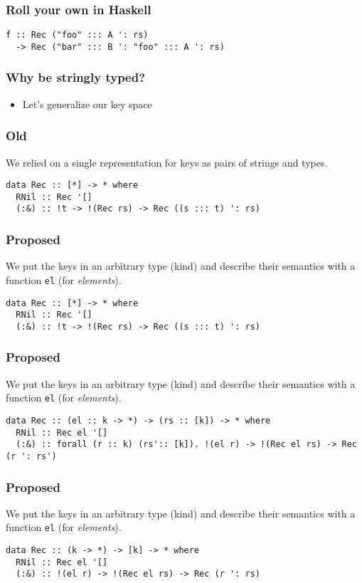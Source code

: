 \documentclass[tikz, 12pt]{beamer}
\begin{document}
\begin{frame}[fragile]
  \frametitle{Roll your own in Haskell}\pause
  \begin{lstlisting}
f :: Rec ("foo" ::: A ': rs)
  -> Rec ("bar" ::: B ': "foo" ::: A ': rs)
  \end{lstlisting}
\end{frame}

\begin{frame}
  \frametitle{Why be stringly typed?}\pause
  \begin{itemize}
    \item Let's generalize our key space
  \end{itemize}
\end{frame}

\begin{frame}[fragile]
  \frametitle{Old}
  We relied on a single representation for keys as pairs of strings and types.
  \begin{lstlisting}
data Rec :: [*] -> * where
  RNil :: Rec '[]
  (:&) :: !t -> !(Rec rs) -> Rec ((s ::: t) ': rs)
  \end{lstlisting}
\end{frame}

\begin{frame}[fragile]
  \frametitle{Proposed}
  We put the keys in an arbitrary type (kind) and describe their semantics with a function \lstinline{el} (for \emph{elements}).
  \begin{lstlisting}
data Rec :: [*] -> * where
  RNil :: Rec '[]
  (:&) :: !t -> !(Rec rs) -> Rec ((s ::: t) ': rs)
  \end{lstlisting}
\end{frame}

\begin{frame}[fragile]
  \frametitle{Proposed}
  We put the keys in an arbitrary type (kind) and describe their semantics with a function \lstinline{el} (for \emph{elements}).
  \begin{lstlisting}
data Rec :: (el :: k -> *) -> (rs :: [k]) -> * where
  RNil :: Rec el '[]
  (:&) :: forall (r :: k) (rs':: [k]). !(el r) -> !(Rec el rs) -> Rec (r ': rs')
  \end{lstlisting}
\end{frame}

\begin{frame}[fragile]
  \frametitle{Proposed}
  We put the keys in an arbitrary type (kind) and describe their semantics with a function \lstinline{el} (for \emph{elements}).
  \begin{lstlisting}
data Rec :: (k -> *) -> [k] -> * where
  RNil :: Rec el '[]
  (:&) :: !(el r) -> !(Rec el rs) -> Rec (r ': rs)
  \end{lstlisting}
\end{frame}
\end{document}

